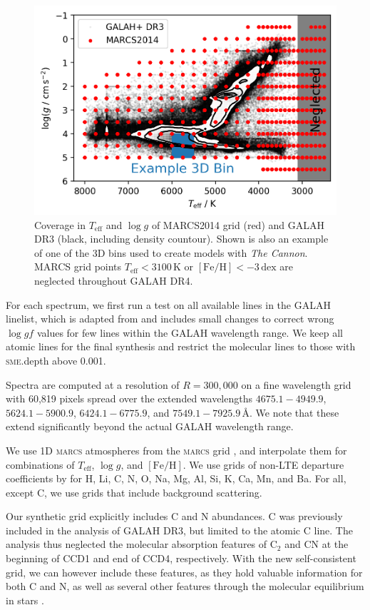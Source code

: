 \documentclass[
  journal=pasa,
  manuscript=research-paper, %
  year=2023,
  volume=37
]{cup-journal}
\newcommand{\Teff}{$T_\mathrm{eff}$\xspace}
\newcommand{\logg}{$\log g$\xspace}
\newcommand{\feh}{$\mathrm{[Fe/H]}$\xspace}
\newcommand{\TheCannon}{\textit{The Cannon}\xspace}
\newcommand{\marcs}{\textsc{marcs}\xspace}
\newcommand{\dex}{\,\mathrm{dex}}	%
\newcommand{\K}{\,\mathrm{K}}	%
\newcommand{\Angstroem}{\,\text{\AA}}	%
\begin{document}
\begin{figure}[hbt!]
 \centering
 \includegraphics[width=\textwidth]{figures/teff_logg_grid_coverage.png}
 \caption{Coverage in \Teff and \logg of MARCS2014 grid (red) and GALAH DR3 (black, including density countour). Shown is also an example of one of the 3D bins used to create models with \TheCannon. MARCS grid points \Teff$ < 3100\K$ or \feh$<-3\dex$ are neglected throughout GALAH DR4.}
 \label{fig:teff_logg_grid_coverage}
\end{figure}

For each spectrum, we first run a test on all available lines in the GALAH linelist, which is adapted from \citet{Heiter2021} and includes small changes to correct wrong $\log gf$ values for few lines within the GALAH wavelength range. We keep all atomic lines for the final synthesis and restrict the molecular lines to those with \textsc{sme}.depth above 0.001.

Spectra are computed at a resolution of $R = 300,000$ on a fine wavelength grid with 60,819 pixels spread over the extended wavelengths $4675.1- 4949.9$, $5624.1-5900.9$, $6424.1-6775.9$, and $7549.1-7925.9 \Angstroem$. We note that these extend significantly beyond the actual GALAH wavelength range.

We use 1D \marcs atmospheres from the \marcs grid \citep[][version 2014]{Gustafsson2008}, and interpolate them for combinations of \Teff, \logg, and \feh. We use grids of non-LTE departure coefficients by \citet{Amarsi2020} for H, Li, C, N, O, Na, Mg, Al, Si, K, Ca, Mn, and Ba. For all, except C, we use grids that include background scattering.

Our synthetic grid explicitly includes C and N abundances. C was previously included in the analysis of GALAH DR3, but limited to the atomic C line. The analysis thus neglected the molecular absorption features of $\mathrm{C_2}$ and CN at the beginning of CCD1 and end of CCD4, respectively. With the new self-consistent grid, we can however include these features, as they hold valuable information for both C and N, as well as several other features through the molecular equilibrium in stars \citep[see e.g.][]{Ting2018}.
\end{document}
